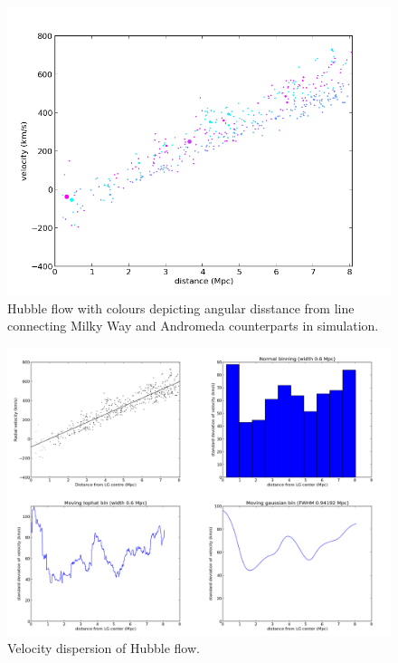 \documentclass[english, oneside]{HYgradu}
\begin{document}
\begin{figure}
   \centering
   \includegraphics[width=\textwidth]{kuvat/hubbleflow-colour.png}
   \caption{Hubble flow with colours depicting angular disstance from line connecting Milky Way and Andromeda counterparts in simulation.}\label{fig:hubbleflow-colour}
\end{figure}

\begin{figure}
   \centering
   \includegraphics[width=\textwidth]{kuvat/velocitydispersion.png}
   \caption{Velocity dispersion of Hubble flow.}\label{fig:velocitydispersion}
\end{figure}
\end{document}
